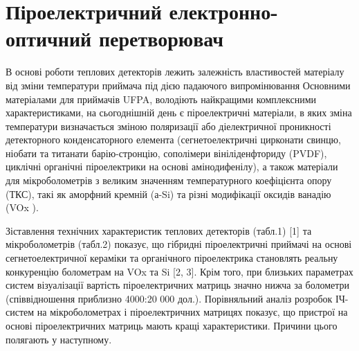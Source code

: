 \documentclass[a4paper,14pt]{extreport}
\begin{document}
\chapter{Піроелектричний електронно-оптичний перетворювач}\par
В основі роботи теплових детекторів лежить залежність властивостей
матеріалу від зміни температури приймача під дією падаючого випромінювання Основними матеріалами для приймачів UFPA,
володіють найкращими комплексними характеристиками, на сьогоднішній день є піроелектричні матеріали, в яких
зміна температури визначається зміною поляризації
або діелектричної проникності детекторного конденсаторного
елемента (сегнетоелектричні цирконати свинцю, ніобати та титанати барію-стронцію, сополімери вініліденфториду (PVDF), циклічні органічні піроелектрики на основі амінодифенілу), а
також матеріали для мікроболометрів з великим значенням температурного коефіцієнта опору (ТКС), такі як аморфний
кремній (а-Si) та різні модифікації оксидів ванадію (VOx
).\par
Зіставлення технічних характеристик теплових детекторів
(табл.1) [1] та мікроболометрів (табл.2) показує, що гібридні
піроелектричні приймачі на основі сегнетоелектричної кераміки та органічного піроелектрика становлять реальну конкуренцію болометрам на VOx та Si [2, 3].
Крім того, при близьких параметрах систем візуалізації вартість піроелектричних матриць значно нижча за болометри (співвідношення приблизно 4000:20 000 дол.).
Порівняльний аналіз розробок ІЧ-систем на мікроболометрах і піроелектричних матрицях показує, що пристрої на основі піроелектричних матриць мають кращі характеристики. Причини цього полягають у наступному.\\ 
\begin{figure}[h!]

\label{ris2}
\end{figure}
 
\end{document}
